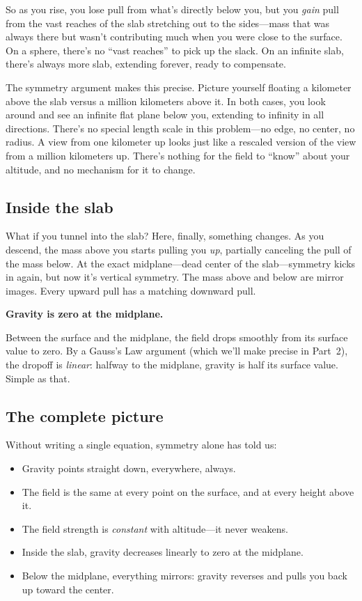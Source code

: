 \documentclass[11pt, letterpaper]{article}
\begin{document}
So as you rise, you lose pull from what's directly below you, but you \textit{gain} pull from the vast reaches of the slab stretching out to the sides---mass that was always there but wasn't contributing much when you were close to the surface. On a sphere, there's no ``vast reaches'' to pick up the slack. On an infinite slab, there's always more slab, extending forever, ready to compensate.

The symmetry argument makes this precise. Picture yourself floating a kilometer above the slab versus a million kilometers above it. In both cases, you look around and see an infinite flat plane below you, extending to infinity in all directions. There's no special length scale in this problem---no edge, no center, no radius. A view from one kilometer up looks just like a rescaled version of the view from a million kilometers up. There's nothing for the field to ``know'' about your altitude, and no mechanism for it to change.

\subsection{Inside the slab}

What if you tunnel into the slab? Here, finally, something changes. As you descend, the mass above you starts pulling you \textit{up}, partially canceling the pull of the mass below. At the exact midplane---dead center of the slab---symmetry kicks in again, but now it's vertical symmetry. The mass above and below are mirror images. Every upward pull has a matching downward pull.

\textbf{Gravity is zero at the midplane.}

Between the surface and the midplane, the field drops smoothly from its surface value to zero. By a Gauss's Law argument (which we'll make precise in Part~2), the dropoff is \textit{linear}: halfway to the midplane, gravity is half its surface value. Simple as that.

\subsection{The complete picture}

Without writing a single equation, symmetry alone has told us:

\begin{itemize}[nosep]
  \item Gravity points straight down, everywhere, always.
  \item The field is the same at every point on the surface, and at every height above it.
  \item The field strength is \textit{constant} with altitude---it never weakens.
  \item Inside the slab, gravity decreases linearly to zero at the midplane.
  \item Below the midplane, everything mirrors: gravity reverses and pulls you back up toward the center.
\end{itemize}
\end{document}
